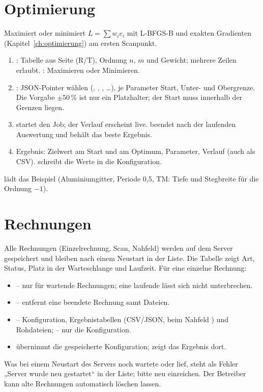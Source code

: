\section{Optimierung}\label{sec:gui-opt}
Maximiert oder minimiert $L=\sum w_ie_i$ mit L-BFGS-B und exakten Gradienten (Kapitel~\ref{ch:optimierung}) am ersten
Scanpunkt.
\begin{enumerate}
  \item {}: Tabelle aus Seite (R/T), Ordnung $n$, $m$ und Gewicht; mehrere Zeilen erlaubt.
        : Maximieren oder Minimieren.
  \item {}: JSON-Pointer wählen (, ,
        ,  \ldots), je Parameter Start, Unter- und Obergrenze. Die
        Vorgabe $\pm50$\,\% ist nur ein Platzhalter; der Start muss innerhalb der Grenzen liegen.
  \item {} startet den Job; der Verlauf erscheint live.  beendet nach der laufenden
        Auswertung und behält das beste Ergebnis.
  \item Ergebnis: Zielwert am Start und am Optimum, Parameter, Verlauf (auch als CSV).  schreibt die Werte in die Konfiguration.
\end{enumerate}
 lädt das Beispiel  (Aluminiumgitter, Periode 0,5\um, TM: Tiefe
und Stegbreite für die Ordnung $-1$).

\section{Rechnungen}
Alle Rechnungen (Einzelrechnung, Scan, Nahfeld) werden auf dem Server gespeichert und
bleiben nach einem Neustart in der Liste. Die Tabelle zeigt Art, Status, Platz in der Warteschlange und Laufzeit.
Für eine einzelne Rechnung:
\begin{itemize}
  \item {} -- nur für wartende Rechnungen; eine laufende lässt sich nicht unterbrechen.
  \item {} -- entfernt eine beendete Rechnung samt Dateien.
  \item {} -- Konfiguration, Ergebnistabellen (CSV/JSON, beim Nahfeld )
        und Rohdateien;  -- nur die Konfiguration.
  \item {} übernimmt die gespeicherte Konfiguration;  zeigt das
        Ergebnis dort.
\end{itemize}
Was bei einem Neustart des Servers noch wartete oder lief, steht als Fehler „Server wurde neu gestartet“ in der Liste;
bitte neu einreichen. Der Betreiber kann alte Rechnungen automatisch löschen lassen.

